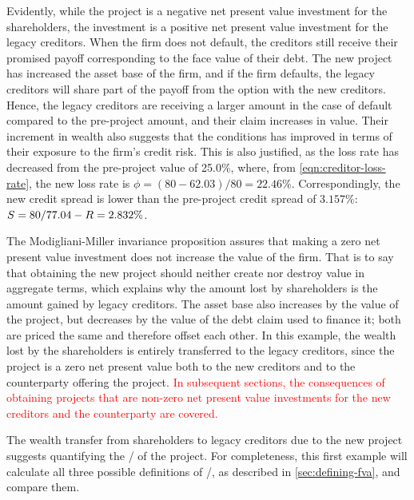 \documentclass[main.tex]{subfiles}
\begin{document}
        Evidently, while the project is a negative net present value investment for the shareholders,
        the investment is a positive net present value investment for the legacy creditors.
        When the firm does not default, the creditors still receive their promised payoff 
        corresponding to the face value of their debt.
        The new project has increased the asset base of the firm, and if the firm defaults, 
        the legacy creditors will share part of the payoff from the option with the new creditors.
        Hence, the legacy creditors are receiving a larger amount in the case of default compared to the pre-project amount, and their claim increases in value.
        Their increment in wealth also suggests that the conditions has improved in terms of their exposure to the firm's credit risk.
        This is also justified, as the loss rate has decreased from the pre-project value of 25.0\%,
        where, from \cref{eqn:creditor-loss-rate}, the new loss rate is $\phi = (80-62.03)/80 = 22.46\%$.
        Correspondingly, the new credit spread is lower than the pre-project credit spread of $3.157\%$:
        $S = 80/77.04 - R = 2.832\%$.

        The Modigliani-Miller invariance proposition assures that making a zero net present value investment 
        does not increase the value of the firm.
        That is to say that obtaining the new project should neither create nor destroy value in aggregate terms,
        which explains why the amount lost by shareholders is the amount gained by legacy creditors.
        The asset base also increases by the value of the project, 
        but decreases by the value of the debt claim used to finance it; 
        both are priced the same and therefore offset each other.
        In this example, the wealth lost by the shareholders is entirely transferred to the legacy creditors,
        since the project is a zero net present value both to the new creditors 
        and to the counterparty offering the project.
        \textcolor{red}{
            In subsequent sections, the consequences of obtaining projects that are non-zero net present value investments
            for the new creditors and the counterparty are covered.
        }

        The wealth transfer from shareholders to legacy creditors due to the new project 
        suggests quantifying the \FVA/ of the project.
        For completeness, this first example will calculate all three possible definitions of \FVA/,
        as described in \cref{sec:defining-fva}, and compare them.
\end{document}
